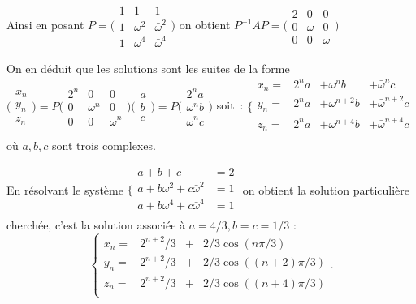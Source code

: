 {{Ainsi en posant $P=\Big(\begin{smallmatrix}
  1&1&1\\1&\omega^{2}&\bar\omega^{2}\\1&\omega^{4}&\bar\omega^{4}\end{smallmatrix}\Big)$ on obtient
$P^{-1}AP=\Big(\begin{smallmatrix}
  2&0&0\\
  0&\omega&0\\
  0&0&\bar\omega\end{smallmatrix}\Big)$

On en déduit que les solutions sont les suites de la forme%
$\Big(\begin{smallmatrix}
  x_{n}\\
  y_{n}\\
  z_{n}  
\end{smallmatrix}\Big)=
P\Big(\begin{smallmatrix}
  2^n&0&0\\
  0&\omega^{n}&0\\
  0&0&\bar\omega^{n}\end{smallmatrix}\Big)
\Big(\begin{smallmatrix}
  a\\b\\c\end{smallmatrix}\Big)
=
P\Big(\begin{smallmatrix}2^na\\\omega^n b\\\bar\omega^nc\end{smallmatrix}\Big)
$ soit~:
$\Big\{\begin{smallmatrix}
  x_{n}=&2^na&+\omega^{n}b  &+\bar\omega^{n}c\\
  y_{n}=&2^na&+\omega^{n+2}b&+\bar\omega^{n+2}c\\
  z_{n}=&2^na&+\omega^{n+4}b&+\bar\omega^{n+4}c\\
\end{smallmatrix}$ où $a,b,c$ sont trois complexes.

En résolvant le système%
$\Big\{\begin{smallmatrix}
  a+b+c&=2\\
  a+b\omega^{2}+c\bar\omega^{2}&=1\\
  a+b\omega^{4}+c\bar\omega^{4}&=1\\
\end{smallmatrix}$
on obtient la solution particulière cherchée,  c'est la solution
associée à $a=4/3, b=c=1/3$ :
$$\left\{\begin{array}{llll}
  x_{n}=&2^{n+2}/3 &+&2/3 \cos(n\pi/3)\\
  y_{n}=&2^{n+2}/3 &+&2/3 \cos((n+2)\pi/3)\\
  z_{n}=&2^{n+2}/3 &+&2/3 \cos((n+4)\pi/3)\\
\end{array}\right..$$}
}